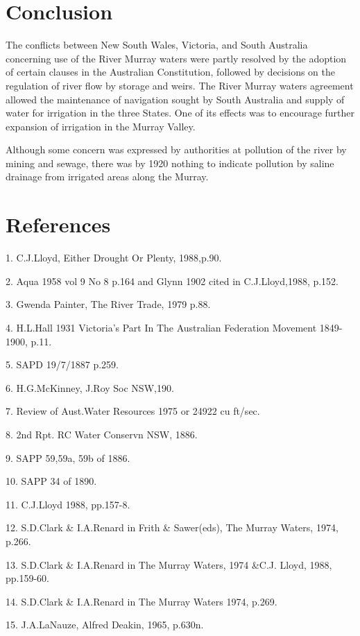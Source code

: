 \section{Conclusion}

The conflicts between New South Wales, Victoria, and South Australia
concerning use of the River Murray waters were partly resolved by the
adoption of certain clauses in the Australian Constitution, followed
by decisions on the regulation of river flow by storage and weirs. The
River Murray waters agreement allowed the maintenance of navigation
sought by South Australia and supply of water for irrigation in the
three States. One of its effects was to encourage further expansion of
irrigation in the Murray Valley.

Although some concern was expressed by authorities at pollution of the
river by mining and sewage, there was by 1920 nothing to indicate
pollution by saline drainage from irrigated areas along the Murray.

\section{References}

1. C.J.Lloyd, Either Drought Or Plenty, 1988,p.90.

2.  Aqua 1958  vol 9 No 8 p.164 and Glynn 1902 cited in C.J.Lloyd,1988,
    p.152.

3. Gwenda Painter, The River Trade, 1979 p.88.

4. H.L.Hall 1931 Victoria's Part In The Australian Federation Movement 1849-
    1900,  p.11.

5. SAPD 19/7/1887 p.259.

6. H.G.McKinney, J.Roy Soc NSW,190.

7. Review of Aust.Water Resources 1975 or 24922 cu ft/sec.

8. 2nd Rpt. RC Water Conservn NSW, 1886.

9. SAPP 59,59a, 59b of 1886.

10. SAPP 34 of 1890.

11. C.J.Lloyd 1988, pp.157-8.

12.  S.D.Clark \& I.A.Renard in Frith \& Sawer(eds), The Murray Waters,
       1974,   p.266.

13. S.D.Clark \& I.A.Renard in The Murray Waters, 1974 \&C.J. Lloyd, 1988,
      pp.159-60.

14. S.D.Clark \& I.A.Renard in The Murray Waters 1974, p.269.

15. J.A.LaNauze, Alfred Deakin, 1965, p.630n.

